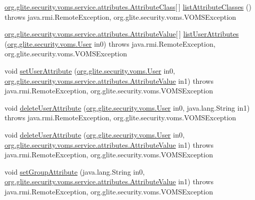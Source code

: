 \begin{DoxyCompactItemize}
\item 
\hyperlink{classorg_1_1glite_1_1security_1_1voms_1_1service_1_1attributes_1_1AttributeClass}{org.glite.security.voms.service.attributes.AttributeClass}\mbox{[}$\,$\mbox{]} \hyperlink{interfaceorg_1_1glite_1_1security_1_1voms_1_1service_1_1attributes_1_1VOMSAttributes_ae7d702ccb9aae9e2467e4d433efbb250}{listAttributeClasses} ()  throws java.rmi.RemoteException, org.glite.security.voms.VOMSException
\item 
\hyperlink{classorg_1_1glite_1_1security_1_1voms_1_1service_1_1attributes_1_1AttributeValue}{org.glite.security.voms.service.attributes.AttributeValue}\mbox{[}$\,$\mbox{]} \hyperlink{interfaceorg_1_1glite_1_1security_1_1voms_1_1service_1_1attributes_1_1VOMSAttributes_a8fee5d85ad4b2fb8c37c844319eb2727}{listUserAttributes} (\hyperlink{classorg_1_1glite_1_1security_1_1voms_1_1User}{org.glite.security.voms.User} in0)  throws java.rmi.RemoteException, org.glite.security.voms.VOMSException
\item 
void \hyperlink{interfaceorg_1_1glite_1_1security_1_1voms_1_1service_1_1attributes_1_1VOMSAttributes_a755b5d37541db7a0c0bdbe33b2e850ec}{setUserAttribute} (\hyperlink{classorg_1_1glite_1_1security_1_1voms_1_1User}{org.glite.security.voms.User} in0, \hyperlink{classorg_1_1glite_1_1security_1_1voms_1_1service_1_1attributes_1_1AttributeValue}{org.glite.security.voms.service.attributes.AttributeValue} in1)  throws java.rmi.RemoteException, org.glite.security.voms.VOMSException
\item 
void \hyperlink{interfaceorg_1_1glite_1_1security_1_1voms_1_1service_1_1attributes_1_1VOMSAttributes_a85c08333fea913f9eb05ff1da01e49c2}{deleteUserAttribute} (\hyperlink{classorg_1_1glite_1_1security_1_1voms_1_1User}{org.glite.security.voms.User} in0, java.lang.String in1)  throws java.rmi.RemoteException, org.glite.security.voms.VOMSException
\item 
void \hyperlink{interfaceorg_1_1glite_1_1security_1_1voms_1_1service_1_1attributes_1_1VOMSAttributes_aaf63aef7fc1eafcc0a263be2b2eca5f9}{deleteUserAttribute} (\hyperlink{classorg_1_1glite_1_1security_1_1voms_1_1User}{org.glite.security.voms.User} in0, \hyperlink{classorg_1_1glite_1_1security_1_1voms_1_1service_1_1attributes_1_1AttributeValue}{org.glite.security.voms.service.attributes.AttributeValue} in1)  throws java.rmi.RemoteException, org.glite.security.voms.VOMSException
\item 
void \hyperlink{interfaceorg_1_1glite_1_1security_1_1voms_1_1service_1_1attributes_1_1VOMSAttributes_aea6d585cbe26db3f11f15cc2b017fb03}{setGroupAttribute} (java.lang.String in0, \hyperlink{classorg_1_1glite_1_1security_1_1voms_1_1service_1_1attributes_1_1AttributeValue}{org.glite.security.voms.service.attributes.AttributeValue} in1)  throws java.rmi.RemoteException, org.glite.security.voms.VOMSException

\end{DoxyCompactItemize}

